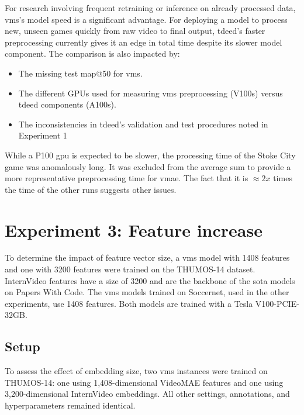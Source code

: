 For research involving frequent retraining or inference on already processed data, \acrshort{vms}'s model speed is a significant advantage. For deploying a model to process new, unseen games quickly from raw video to final output, \acrshort{tdeed}'s faster preprocessing currently gives it an edge in total time despite its slower model component. The comparison is also impacted by: 

\begin{itemize}
    \item The missing test \acrshort{map}@50 for \acrshort{vms}.
    \item The different GPUs used for measuring \acrshort{vms} preprocessing (V100s) versus \acrshort{tdeed} components (A100s).
    \item The inconsistencies in \acrshort{tdeed}'s validation and test procedures noted in Experiment 1
\end{itemize}

While a P100 \acrshort{gpu} is expected to be slower, the processing time of the Stoke City game was anomalously long. It was excluded from the average sum to provide a more representative preprocessing time for \acrshort{vmae}. The fact that it is $\approx2x$ times the time of the other runs suggests other issues. 

\section{Experiment 3: Feature increase}
\label{sec:experiment3}
To determine the impact of feature vector size, a \acrshort{vms} model with 1408 features and one with 3200 features were trained on the THUMOS-14 dataset.
InternVideo features have a size of 3200 and are the backbone of the \acrshort{sota} models on Papers With Code. The \acrshort{vms} models trained on Soccernet, used in the other experiments, use 1408 features. Both models are trained with a Tesla V100-PCIE-32GB.


\subsection{Setup}
\label{ssec:ex3_setup}

To assess the effect of embedding size, two \acrshort{vms} instances were trained on THUMOS-14\cite{dataset:thumos}: one using 1,408-dimensional VideoMAE features and one using 3,200-dimensional InternVideo embeddings. All other settings, annotations, and hyperparameters remained identical.

